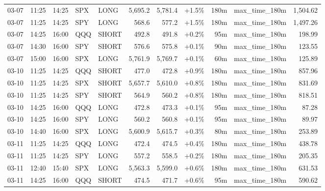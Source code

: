 \documentclass[11pt,a4paper,twoside]{article}
\begin{document}
\begin{center}
\begin{longtable}{>{\color{txtmain}}l l l l l r r r r >{\color{txtmain}}l r}
03-07 & 11:25 & 14:25 & SPX & LONG & 5,695.2 & 5,781.4 & \textcolor{wingreen}{+1.5\%} & 180m & max\_time\_180m & \textcolor{wingreen}{1,504.62} \\
03-07 & 11:25 & 14:25 & SPY & LONG & 568.6 & 577.2 & \textcolor{wingreen}{+1.5\%} & 180m & max\_time\_180m & \textcolor{wingreen}{1,497.26} \\
03-07 & 14:25 & 16:00 & QQQ & SHORT & 492.8 & 491.8 & \textcolor{wingreen}{+0.2\%} & 95m & max\_time\_180m & \textcolor{wingreen}{198.99} \\
03-07 & 14:30 & 16:00 & SPY & SHORT & 576.6 & 575.8 & \textcolor{wingreen}{+0.1\%} & 90m & max\_time\_180m & \textcolor{wingreen}{123.55} \\
03-07 & 15:00 & 16:00 & SPX & LONG & 5,761.9 & 5,769.7 & \textcolor{wingreen}{+0.1\%} & 60m & max\_time\_180m & \textcolor{wingreen}{125.89} \\
03-10 & 11:25 & 14:25 & QQQ & SHORT & 477.0 & 472.8 & \textcolor{wingreen}{+0.9\%} & 180m & max\_time\_180m & \textcolor{wingreen}{857.96} \\
03-10 & 11:25 & 14:25 & SPX & SHORT & 5,657.7 & 5,610.0 & \textcolor{wingreen}{+0.8\%} & 180m & max\_time\_180m & \textcolor{wingreen}{831.69} \\
03-10 & 11:25 & 14:25 & SPY & SHORT & 564.9 & 560.2 & \textcolor{wingreen}{+0.8\%} & 180m & max\_time\_180m & \textcolor{wingreen}{818.51} \\
03-10 & 14:25 & 16:00 & QQQ & LONG & 472.8 & 473.3 & \textcolor{wingreen}{+0.1\%} & 95m & max\_time\_180m & \textcolor{wingreen}{87.28} \\
03-10 & 14:25 & 16:00 & SPY & LONG & 560.2 & 560.8 & \textcolor{wingreen}{+0.1\%} & 95m & max\_time\_180m & \textcolor{wingreen}{89.97} \\
03-10 & 14:40 & 16:00 & SPX & LONG & 5,600.9 & 5,615.7 & \textcolor{wingreen}{+0.3\%} & 80m & max\_time\_180m & \textcolor{wingreen}{253.89} \\
03-11 & 11:25 & 14:25 & QQQ & LONG & 472.4 & 474.5 & \textcolor{wingreen}{+0.4\%} & 180m & max\_time\_180m & \textcolor{wingreen}{438.78} \\
03-11 & 11:25 & 14:25 & SPY & LONG & 557.2 & 558.5 & \textcolor{wingreen}{+0.2\%} & 180m & max\_time\_180m & \textcolor{wingreen}{205.35} \\
03-11 & 12:40 & 15:40 & SPX & LONG & 5,563.3 & 5,599.0 & \textcolor{wingreen}{+0.6\%} & 180m & max\_time\_180m & \textcolor{wingreen}{631.53} \\
03-11 & 14:25 & 16:00 & QQQ & SHORT & 474.5 & 471.7 & \textcolor{wingreen}{+0.6\%} & 95m & max\_time\_180m & \textcolor{wingreen}{590.62} \\

\end{longtable}
\end{center}
\end{document}
